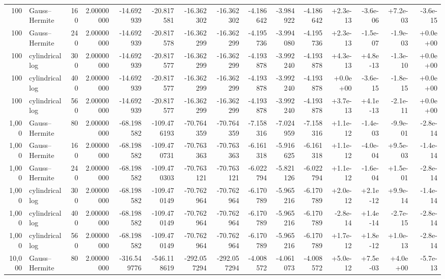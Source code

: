 \documentclass[journal=jctcce,manuscript=suppinfo]{achemso}
\begin{document}
\begin{table}[H]
{\begin{tabular}{@{}rlrr|rrrrrrr|rrrr@{}}
100 & Gauss--Hermite & 160 & 2.00000000 & -14.692939 & -20.817581 & -16.362302 & -16.362302 & -4.186642 & -3.984922 & -4.186642 & +2.3e-13 & -3.6e-06 & +7.2e-03 & -3.6e-15 \\
100 & Gauss--Hermite & 240 & 2.00000000 & -14.692939 & -20.817578 & -16.362299 & -16.362299 & -4.195736 & -3.994080 & -4.195736 & +2.3e-13 & -1.5e-07 & -1.9e-03 & +0.0e+00 \\
100 & cylindrical log & 300 & 2.00000000 & -14.692939 & -20.817577 & -16.362299 & -16.362299 & -4.193878 & -3.992240 & -4.193878 & +4.3e-13 & +4.8e-13 & -1.3e-10 & +0.0e+00 \\
100 & cylindrical log & 400 & 2.00000000 & -14.692939 & -20.817577 & -16.362299 & -16.362299 & -4.193878 & -3.992240 & -4.193878 & +0.0e+00 & -3.6e-15 & -1.8e-15 & +0.0e+00 \\
100 & cylindrical log & 560 & 2.00000000 & -14.692939 & -20.817577 & -16.362299 & -16.362299 & -4.193878 & -3.992240 & -4.193878 & +3.7e-13 & +4.1e-13 & -2.1e-11 & +0.0e+00 \\
1,000 & Gauss--Hermite & 80 & 2.00000000 & -68.198582 & -109.476193 & -70.764359 & -70.764359 & -7.158316 & -7.024959 & -7.158316 & +1.1e-12 & -1.4e-03 & -9.9e-01 & -2.8e-14 \\
1,000 & Gauss--Hermite & 160 & 2.00000000 & -68.198582 & -109.470731 & -70.763363 & -70.763363 & -6.161318 & -5.916625 & -6.161318 & +1.1e-12 & -4.0e-04 & +9.5e-03 & -1.4e-14 \\
1,000 & Gauss--Hermite & 240 & 2.00000000 & -68.198582 & -109.470303 & -70.763121 & -70.763121 & -6.022794 & -5.821126 & -6.022794 & +1.1e-12 & -1.6e-04 & +1.5e-01 & -2.8e-14 \\
1,000 & cylindrical log & 300 & 2.00000000 & -68.198582 & -109.470149 & -70.762964 & -70.762964 & -6.170789 & -5.965216 & -6.170789 & +2.0e-12 & +2.1e-12 & +9.9e-14 & -1.4e-14 \\
1,000 & cylindrical log & 400 & 2.00000000 & -68.198582 & -109.470149 & -70.762964 & -70.762964 & -6.170789 & -5.965216 & -6.170789 & -2.8e-14 & +1.4e-14 & -2.7e-15 & -2.8e-14 \\
1,000 & cylindrical log & 560 & 2.00000000 & -68.198582 & -109.470149 & -70.762964 & -70.762964 & -6.170789 & -5.965216 & -6.170789 & +1.7e-12 & +1.8e-12 & +1.0e-13 & -2.8e-14 \\
10,000 & Gauss--Hermite & 80 & 2.00000000 & -316.549776 & -546.118619 & -292.057294 & -292.057294 & -4.008572 & -4.061073 & -4.008572 & +5.0e-12 & +7.5e-03 & +4.0e+00 & -5.7e-13 \\

\end{tabular}}
\end{table}
\end{document}
